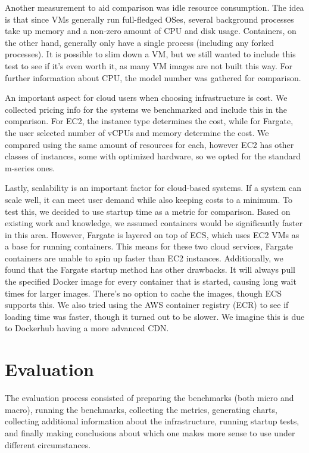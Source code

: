 \documentclass[11pt]{article}
\begin{document}
Another measurement to aid comparison was idle resource consumption. The idea is that since VMs generally run full-fledged OSes, several background processes take up memory and a non-zero amount of CPU and disk usage. Containers, on the other hand, generally only have a single process (including any forked processes). It is possible to slim down a VM, but we still wanted to include this test to see if it's even worth it, as many VM images are not built this way. For further information about CPU, the model number was gathered for comparison.

An important aspect for cloud users when choosing infrastructure is cost. We collected pricing info for the systems we benchmarked and include this in the comparison. For EC2, the instance type determines the cost, while for Fargate, the user selected number of vCPUs and memory determine the cost. We compared using the same amount of resources for each, however EC2 has other classes of instances, some with optimized hardware, so we opted for the standard m-series ones.

Lastly, scalability is an important factor for cloud-based systems. If a system can scale well, it can meet user demand while also keeping costs to a minimum. To test this, we decided to use startup time as a metric for comparison. Based on existing work and knowledge, we assumed containers would be significantly faster in this area. However, Fargate is layered on top of ECS, which uses EC2 VMs as a base for running containers. This means for these two cloud services, Fargate containers are unable to spin up faster than EC2 instances. Additionally, we found that the Fargate startup method has other drawbacks. It will always pull the specified Docker image for every container that is started, causing long wait times for larger images. There's no option to cache the images, though ECS supports this. We also tried using the AWS container registry (ECR) to see if loading time was faster, though it turned out to be slower. We imagine this is due to Dockerhub having a more advanced CDN.

\vspace{3mm} %

\section{Evaluation}
\vspace{5mm} %

The evaluation process consisted of preparing the benchmarks (both micro and macro), running the benchmarks, collecting the metrics, generating charts, collecting additional information about the infrastructure, running startup tests, and finally making conclusions about which one makes more sense to use under different circumstances.
\end{document}
